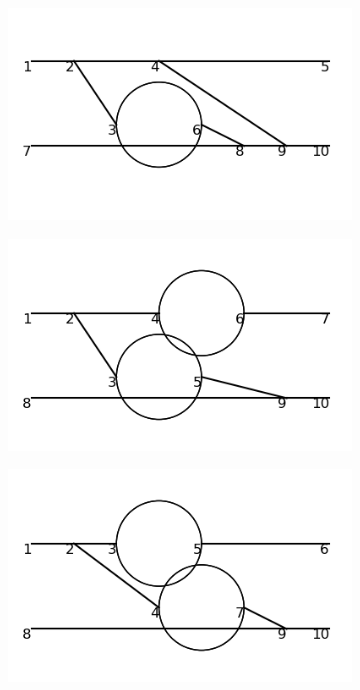 \documentclass[11pt,a4paper,twoside,pdf]{article}
\numberwithin{equation}{section}
\begin{document}
\begin{figure}[h!]
\begin{subfigure}[t]{0.16\textwidth}
    \end{subfigure}
    \begin{subfigure}[t]{0.16\textwidth}
        \centering
        \includegraphics[width=\textwidth]{plots/order6_2to2/27.png}
    \end{subfigure}
    \hfill
    \begin{subfigure}[t]{0.16\textwidth}
        \centering
        \includegraphics[width=\textwidth]{plots/order6_2to2/28.png}
    \end{subfigure}
    \hfill
    \begin{subfigure}[t]{0.16\textwidth}
        \centering
        \includegraphics[width=\textwidth]{plots/order6_2to2/29.png}

\end{subfigure}
\end{figure}
\end{document}

